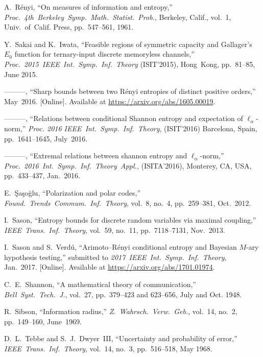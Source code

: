 \documentclass[conference, draftcls, onecolumn]{IEEEtran}
\theoremstyle{plain}
\begin{document}
\begin{thebibliography}{99}
A.~R\'{e}nyi,
``On measures of information and entropy,''
\emph{Proc.\ 4th\ Berkeley\ Symp.\ Math.\ Statist.\ Prob.},
Berkeley, Calif., vol.~1, Univ.\ of\ Calif. Press, pp.~547--561, 1961.

Y.~Sakai and K.~Iwata,
``Feasible regions of symmetric capacity and Gallager's $E_{0}$ function for ternary-input discrete memoryless channels,''
\emph{Proc.\ 2015\ IEEE\ Int.\ Symp.\ Inf.\ Theory} (ISIT'2015),
Hong~Kong, pp.~81--85, June 2015.

---------,
``Sharp bounds between two R\'{e}nyi entropies of distinct positive orders,''
May~2016.
[Online]. Available at \url{https://arxiv.org/abs/1605.00019}.

---------,
``Relations between conditional Shannon entropy and expectation of $\ell_{\alpha}$-norm,''
\emph{Proc. 2016 IEEE\ Int.\ Symp.\ Inf.\ Theory}, (ISIT'2016)
Barcelona, Spain, pp.~1641--1645, July~2016.

---------,
``Extremal relations between shannon entropy and $\ell_{\alpha}$-norm,''
\emph{Proc.\ 2016\ Int.\ Symp.\ Inf.\ Theory\ Appl.}, (ISITA'2016),
Monterey, CA, USA, pp.~433--437, Jan.~2016.

E.~\c{S}a\c{s}o\u{g}lu,
``Polarization and polar codes,''
\emph{Found.\ Trends\ Commum.\ Inf.\ Theory},
vol.~8, no.~4, pp.~259--381, Oct.~2012.

I.~Sason,
``Entropy bounds for discrete random variables via maximal coupling,''
\emph{IEEE\ Trans.\ Inf.\ Theory},
vol.~59, no.~11, pp.~7118--7131, Nov.~2013.

I.~Sason and S.~Verd\'{u},
``Arimoto--R\'{e}nyi conditional entropy and Bayesian $M$-ary hypothesis testing,''
submitted to \emph{2017\ IEEE\ Int.\ Symp.\ Inf.\ Theory},
Jan.~2017.
[Online]. Available at \url{https://arxiv.org/abs/1701.01974}.

C.~E.~Shannon,
``A mathematical theory of communication,''
\emph{Bell\ Syst.\ Tech.\ J.},
vol.~27, pp.~379--423 and 623--656, July and Oct. 1948.

R.~Sibson,
``Information radius,''
\emph{Z.\ Wahrsch.\ Verw.\ Geb.},
vol.~14, no.~2, pp.~149--160, June~1969.

D.~L.~Tebbe and S.~J.~Dwyer~III,
``Uncertainty and probability of error,''
\emph{IEEE\ Trans.\ Inf.\ Theory},
vol.~14, no.~3, pp.~516--518, May 1968.


\end{thebibliography}
\end{document}
